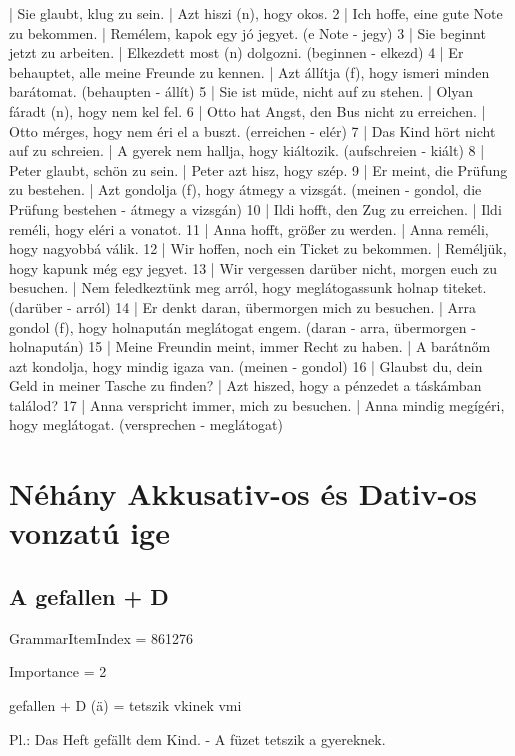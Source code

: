 \documentclass{article}
\newenvironment{desc}{\verbatim}{\endverbatim}
\newenvironment{exmp}{\verbatim}{\endverbatim}
\begin{document}
\begin{exmp}
1 | Sie glaubt, klug zu sein. | Azt hiszi (n), hogy okos.
2 | Ich hoffe, eine gute Note zu bekommen. | Remélem, kapok egy jó jegyet. (e Note - jegy)
3 | Sie beginnt jetzt zu arbeiten. | Elkezdett most (n) dolgozni. (beginnen - elkezd)
4 | Er behauptet, alle meine Freunde zu kennen. | Azt állítja (f), hogy ismeri minden barátomat. (behaupten - állít)
5 | Sie ist müde, nicht auf zu stehen. | Olyan fáradt (n), hogy nem kel fel.
6 | Otto hat Angst, den Bus nicht zu erreichen. | Otto mérges, hogy nem éri el a buszt. (erreichen - elér)
7 | Das Kind hört nicht auf zu schreien. | A gyerek nem hallja, hogy kiáltozik. (aufschreien - kiált)
8 | Peter glaubt, schön zu sein. | Peter azt hisz, hogy szép.
9 | Er meint, die Prüfung zu bestehen. | Azt gondolja (f), hogy átmegy a vizsgát. (meinen - gondol, die Prüfung bestehen - átmegy a vizsgán)
10 | Ildi hofft, den Zug zu erreichen. | Ildi reméli, hogy eléri a vonatot.
11 | Anna hofft, größer zu werden. | Anna reméli, hogy nagyobbá válik.
12 | Wir hoffen, noch ein Ticket zu bekommen. | Reméljük, hogy kapunk még egy jegyet.
13 | Wir vergessen darüber nicht, morgen euch zu besuchen. | Nem feledkeztünk meg arról, hogy meglátogassunk holnap titeket. (darüber - arról)
14 | Er denkt daran, übermorgen mich zu besuchen. | Arra gondol (f), hogy holnapután meglátogat engem. (daran - arra, übermorgen - holnapután)
15 | Meine Freundin meint, immer Recht zu haben. | A barátnőm azt kondolja, hogy mindig igaza van. (meinen - gondol)
16 | Glaubst du, dein Geld in meiner Tasche zu finden? | Azt hiszed, hogy a pénzedet a táskámban találod?
17 | Anna verspricht immer, mich zu besuchen. | Anna mindig megígéri, hogy meglátogat. (versprechen - meglátogat)
\end{exmp}

\section{Néhány Akkusativ-os és Dativ-os vonzatú ige}

\subsection{A gefallen + D}

GrammarItemIndex = 861276

Importance = 2

\begin{desc}
gefallen + D (ä) = tetszik vkinek vmi

Pl.: Das Heft gefällt dem Kind. - A füzet tetszik a gyereknek.
\end{desc}
\end{document}

